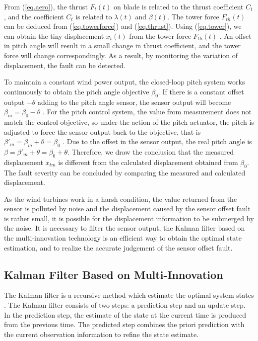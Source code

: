 From (\ref{eq.aero}), the thrust $F_t(t)$ on
blade   is related to the thrust coefficient $C_t$ , and the coefficient $C_t$
is related to  $\lambda(t)$ and $\beta(t)$. The tower force $F_{th}(t)$
can be deduced from (\ref{eq.towerforce}) and (\ref{eq.thrust}).
Using (\ref{eq.tower}), we can obtain the tiny displacement $x_t(t)$
 from the tower force $F_{th}(t)$ . An offset in pitch angle will result
 in a small change in thrust coefficient, and the tower force will change
 correspondingly.
As a result, by monitoring the variation of displacement, the fault can be detected.


To maintain a constant wind power output, the closed-loop pitch system works
continuously to obtain the pitch angle objective $\beta_0$. If there
is a constant offset output $-\theta$  adding to the pitch angle sensor,
the sensor output will become $\beta_m = \beta_0 - \theta$ . For the pitch control system,
the value from measurement does not match the control objective, so under
the action of the pitch actuator, the pitch is adjusted  to force the sensor output
back to the objective, that is $\beta'_m=\beta_m + \theta = \beta_0$ . Due to the
offset in the sensor output, the real pitch angle is  $\beta=\beta'_m+\theta=\beta_0+\theta$.
Therefore, we draw the conclusion that the measured displacement $x_{tm}$  is
different from the calculated displacement obtained from $\beta_0$. The fault
severity can be concluded by comparing the measured and calculated displacement.

As the wind turbines work in a harsh condition, the value returned from
the sensor is polluted by noise and the displacement caused by
the sensor offset fault is rather small, it is possible for the displacement
 information to be submerged by the noise. It is necessary to filter the
 sensor output, the Kalman filter based on the multi-innovation technology
 is an efficient way to obtain the optimal state estimation, and to realize
the accurate judgement of the sensor offset fault.



\subsection{Kalman Filter Based on Multi-Innovation}

The Kalman filter is a recursive method which estimate the optimal
system states \cite{ref:16}. The Kalman filter consists of two steps: a prediction
step and an update step. In the prediction step, the estimate of the
state at the current time is produced from the previous time.
The predicted step combines the priori prediction with the current
observation information to refine the state estimate.

